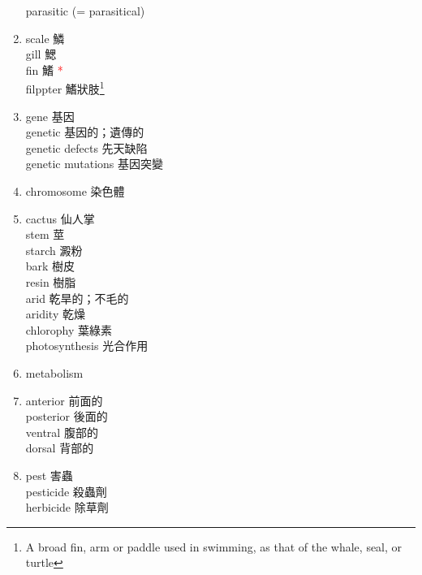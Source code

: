 \documentclass[twoside,b5paper]{book}
\begin{document}
\begin{enumerate}
      parasitic  (= parasitical)
    \item
      scale  鱗\\
      gill  鰓\\
      fin  鰭 \textcolor{red}{*}\\
      filppter  鰭狀肢\footnote{A broad fin, arm or paddle used in swimming, as that of the whale, seal, or turtle}
    \item
      gene  基因\\
      genetic  基因的；遺傳的\\
      genetic defects 先天缺陷\\
      genetic mutations 基因突變
    \item
      chromosome  染色體\\
    \item
      cactus  仙人掌\\
      stem  莖\\
      starch  澱粉\\
      bark 樹皮\\
      resin  樹脂\\
      arid  乾旱的；不毛的\\
      aridity  乾燥\\
      chlorophy  葉綠素\\
      photosynthesis  光合作用
    \item
      metabolism \\
    \item
      anterior 前面的\\
      posterior  後面的\\
      ventral  腹部的\\
      dorsal  背部的
    \item
      pest  害蟲\\
      pesticide  殺蟲劑\\
      herbicide  除草劑
  \end{enumerate}
\end{document}
